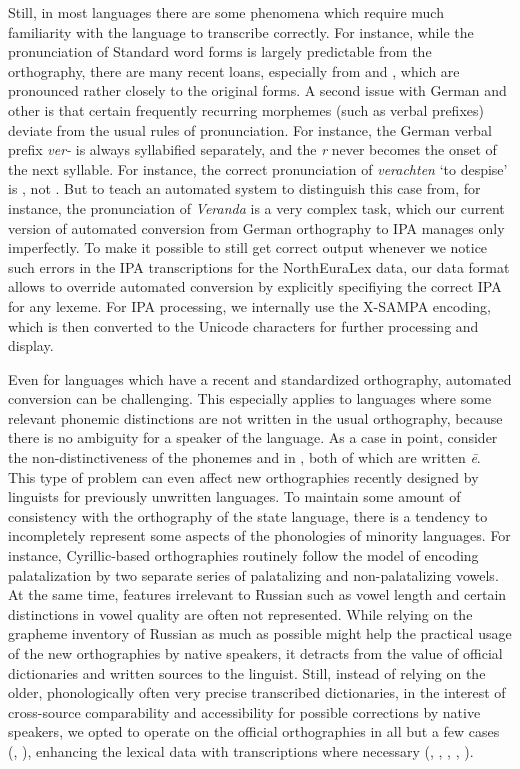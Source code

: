 Still, in most languages there are some phenomena which require much familiarity with the language to transcribe correctly. For instance, while the pronunciation of Standard  word forms is largely predictable from the orthography, there are many recent loans, especially from  and , which are pronounced rather closely to the original forms. A second issue with German and other  is that certain frequently recurring morphemes (such as verbal prefixes) deviate from the usual rules of pronunciation. For instance, the German verbal prefix \textit{ver-} is always syllabified separately, and the \textit{r} never becomes the onset of the next syllable. For instance, the correct pronunciation of \textit{verachten} `to despise' is \ipa{[fE5"PaXtn]}, not \ipa{[fE"\;RaXtn]}. But to teach an automated system to distinguish this case from, for instance, the pronunciation \ipa{[ve"\;Randa]} of \textit{Veranda} is a very complex task, which our current version of automated conversion from German orthography to IPA manages only imperfectly. To make it possible to still get correct output whenever we notice such errors in the IPA transcriptions for the NorthEuraLex data, our data format allows to override automated conversion by explicitly specifiying the correct IPA for any lexeme. For IPA processing, we internally use the X-SAMPA encoding, which is then converted to the Unicode characters for further processing and display.

Even for languages which have a recent and standardized orthography, automated conversion can be challenging. This especially applies to languages where some relevant phonemic distinctions are not written in the usual orthography, because there is no ambiguity for a speaker of the language. As a case in point, consider the non-distinctiveness of the phonemes \ipa{[e:]} and \ipa{[\ae :]} in , both of which are written \textit{\={e}}. This type of problem can even affect new orthographies recently designed by linguists for previously unwritten languages. To maintain some amount of consistency with the orthography of the state language, there is a tendency to incompletely represent some aspects of the phonologies of minority languages. For instance, Cyrillic-based orthographies routinely follow the  model of encoding palatalization by two separate series of palatalizing and non-palatalizing vowels. At the same time, features irrelevant to Russian such as vowel length and certain distinctions in vowel quality are often not represented. While relying on the grapheme inventory of Russian as much as possible might help the practical usage of the new orthographies by native speakers, it detracts from the value of official dictionaries and written sources to the linguist. Still, instead of relying on the older, phonologically often very precise transcribed dictionaries, in the interest of cross-source comparability and accessibility for possible corrections by native speakers, we opted to operate on the official orthographies in all but a few cases (, ), enhancing the lexical data with transcriptions where necessary (, , , , ).

